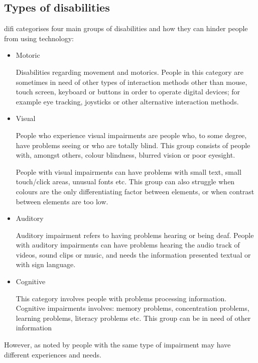 \subsection{Types of disabilities}
\Gls{difi} categorises four main groups of disabilities and how they can hinder people from using technology:
\begin{itemize}
    \item Motoric 
    
    Disabilities regarding movement and motorics. People in this category are sometimes in need of other types of interaction methods other than mouse, touch screen, keyboard or buttons in order to operate digital devices; for example eye tracking, joysticks or other alternative interaction methods.
    \item Visual
    
    People who experience visual impairments are people who, to some degree, have problems seeing or who are totally blind. This group consists of people with, amongst others, colour blindness, blurred vision or poor eyesight. 
    
    People with visual impairments can have problems with small text, small touch/click areas, unusual fonts etc. This group can also struggle when colours are the only differentiating factor between elements, or when contrast between elements are too low. 
    \item Auditory
    
    Auditory impairment refers to having problems hearing or being deaf. People with auditory impairments can have problems hearing the audio track of videos, sound clips or music, and needs the information presented textual or with sign language. 
    
    \item Cognitive
    
    This category involves people with problems processing information. Cognitive impairments involves: memory problems, concentration problems, learning problems, literacy problems etc. This group can be in need of other information
\end{itemize}

However, as noted by \textcite[p. 22]{world_health_organization_world_2011} people with the same type of impairment may have different experiences and needs. \\ 


